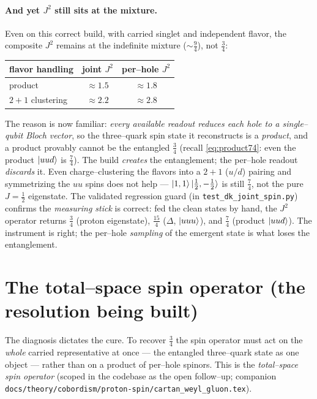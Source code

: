 \documentclass[11pt,oneside]{article}
\newcommand{\code}[1]{\texttt{#1}}
\begin{document}
\paragraph{And yet $J^2$ still sits at the mixture.}
Even on this correct build, with carried singlet and independent flavor, the
composite $J^2$ remains at the indefinite mixture ($\sim\tfrac94$), not
$\tfrac34$:
\begin{center}
\begin{tabular}{lcc}
\toprule
flavor handling & joint $J^2$ & per--hole $J^2$ \\
\midrule
product           & $\approx1.5$ & $\approx1.8$ \\
$2{+}1$ clustering & $\approx2.2$ & $\approx2.8$ \\
\bottomrule
\end{tabular}
\end{center}
The reason is now familiar: \emph{every available readout reduces each hole to a
single--qubit Bloch vector}, so the three--quark spin state it reconstructs is a
\emph{product}, and a product provably cannot be the entangled $\tfrac34$ (recall
\eqref{eq:product74}: even the product $\ket{uud}$ is $\tfrac74$). The build
\emph{creates} the entanglement; the per--hole readout \emph{discards} it. Even
charge--clustering the flavors into a $2{+}1$ ($u/d$) pairing and symmetrizing
the $uu$ spins does not help --- $\ket{1,1}\ket{\tfrac12,-\tfrac12}$ is still
$\tfrac74$, not the pure $J=\tfrac12$ eigenstate. The validated regression guard
(in \code{test\_dk\_joint\_spin.py}) confirms the \emph{measuring stick} is
correct: fed the clean states by hand, the $J^2$ operator returns
$\tfrac34$ (proton eigenstate), $\tfrac{15}{4}$ ($\Delta$, $\ket{uuu}$), and
$\tfrac74$ (product $\ket{uud}$). The instrument is right; the per--hole
\emph{sampling} of the emergent state is what loses the entanglement.

\section{The total--space spin operator (the resolution being built)}
\label{sec:totalspace}

The diagnosis dictates the cure. To recover $\tfrac34$ the spin operator must
act on the \emph{whole} carried representative at once --- the entangled
three--quark state as one object --- rather than on a product of per--hole
spinors. This is the \emph{total--space spin operator}
(scoped in the codebase as the open follow--up; companion
\code{docs/theory/cobordism/proton-spin/cartan\_weyl\_gluon.tex}).
\end{document}
